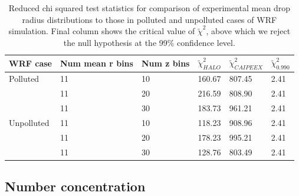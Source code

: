 \documentclass{article}
\begin{document}
\begin{table}[ht]
\centering
\begin{tabular}{@{}llllll@{}}
\toprule
\textbf{WRF case} & \textbf{Num mean r bins} & \textbf{Num z bins} & \textbf{$\tilde\chi^2_{HALO}$} & \textbf{$\tilde\chi^2_{CAIPEEX}$} & \textbf{$\tilde\chi^2_{0.990}$} \\ \midrule
Polluted & 11 & 10 & 160.67 & 807.45 & 2.41 \\
 & 11 & 20 & 216.59 & 808.90 & 2.41 \\
 & 11 & 30 & 183.73 & 961.21 & 2.41 \\
Unpolluted & 11 & 10 & 118.23 & 908.96 & 2.41 \\
 & 11 & 20 & 178.23 & 995.21 & 2.41 \\
 & 11 & 30 & 128.76 & 803.49 & 2.41 \\ \bottomrule
\end{tabular}
\caption{Reduced chi squared test statistics for comparison of experimental mean drop radius distributions to those in polluted and unpolluted cases of WRF simulation. Final column shows the critical value of $\tilde\chi^2$, above which we reject the null hypothesis at the 99\% confidence level.}
\label{chisqmeanr}
\end{table}

\clearpage
\newpage

\subsection{Number concentration}
\end{document}
